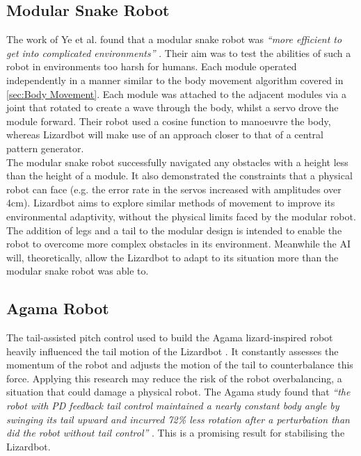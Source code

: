 \documentclass{article}
\begin{document}
\subsection{Modular Snake Robot}
\label{sec:Modular Snake Robot}
The work of Ye et al.  found that a modular snake robot was \textit{“more efficient to get into complicated environments”} . Their aim was to test the abilities of such a robot in environments too harsh for humans. Each module operated independently in a manner similar to the body movement algorithm covered in \ref{sec:Body Movement}. Each module was attached to the adjacent modules via a joint that rotated to create a wave through the body, whilst a servo drove the module forward. Their robot used a cosine function to manoeuvre the body, whereas Lizardbot will make use of an approach closer to that of a central pattern generator. \\
The modular snake robot successfully navigated any obstacles with a height less than the height of a module. It also demonstrated the constraints that a physical robot can face (e.g. the error rate in the servos increased with amplitudes over 4cm). Lizardbot aims to explore similar methods of movement to improve its environmental adaptivity, without the physical limits faced by the modular robot. The addition of legs and a tail to the modular design is intended to enable the robot to overcome more complex obstacles in its environment. Meanwhile the AI will, theoretically, allow the Lizardbot to adapt to its situation more than the modular snake robot was able to.

\subsection{Agama Robot}
\label{sec:Agama Robot}
The tail-assisted pitch control used to build the Agama lizard-inspired robot heavily influenced the tail motion of the Lizardbot . It constantly assesses the momentum of the robot and adjusts the motion of the tail to counterbalance this force. Applying this research may reduce the risk of the robot overbalancing, a situation that could damage a physical robot. The Agama study found that \textit{“the robot with PD feedback tail control maintained a nearly constant body angle by swinging its tail upward and incurred 72\% less rotation after a perturbation than did the robot without tail control”} . This is a promising result for stabilising the Lizardbot.
\end{document}
